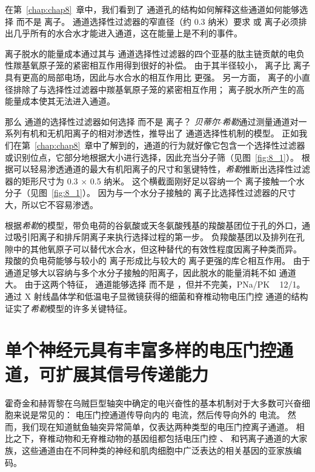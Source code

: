 在第~\ref{chap:chap8}~章中，我们看到了  通道孔的结构如何解释这些通道如何能够选择  而不是  离子。
 通道选择性过滤器的窄直径（约 0.3 纳米）要求  或  离子必须排出几乎所有的水合水才能进入通道，这在能量上是不利的事件。


 离子脱水的能量成本通过其与  通道选择性过滤器的四个亚基的肽主链贡献的电负性羰基氧原子笼的紧密相互作用得到很好的补偿。
由于其半径较小， 离子比  离子具有更高的局部电场，因此与水合水的相互作用比  更强。
另一方面， 离子的小直径排除了与选择性过滤器中羰基氧原子笼的紧密相互作用；
 离子脱水所产生的高能量成本使其无法进入通道。


那么  通道的选择性过滤器如何选择  而不是  离子？
\textit{贝蒂尔$\cdot$希勒}通过测量通道对一系列有机和无机阳离子的相对渗透性，推导出了  通道选择性机制的模型。
正如我们在第~\ref{chap:chap8}~章中了解到的，通道的行为就好像它包含一个选择性过滤器或识别位点，它部分地根据大小进行选择，因此充当分子筛（见图~\ref{fig:8_1}）。
根据可以轻易渗透通道的最大有机阳离子的尺寸和氢键特性，\textit{希勒}推断出选择性过滤器的矩形尺寸为 0.3 × 0.5 纳米。
这个横截面刚好足以容纳一个  离子接触一个水分子（见图~\ref{fig:8_1}）。
因为与一个水分子接触的  离子比选择性过滤器的尺寸大，所以它不容易渗透。


根据\textit{希勒}的模型，带负电荷的谷氨酸或天冬氨酸残基的羧酸基团位于孔的外口，通过吸引阳离子和排斥阴离子来执行选择过程的第一步。
负羧酸基团以及排列在孔隙中的其他氧原子可以替代水合水，但这种替代的有效性程度因离子种类而异。
羧酸的负电荷能够与较小的  离子形成比与较大的  离子更强的库仑相互作用。
由于  通道足够大以容纳与多个水分子接触的阳离子，因此脱水的能量消耗不如  通道大。
由于这两个特征， 通道能够选择  而不是 ，但并不完美，PNa/PK ~ 12/1。
通过 X 射线晶体学和低温电子显微镜获得的细菌和脊椎动物电压门控  通道的结构证实了\textit{希勒}模型的许多关键特征。



\section{单个神经元具有丰富多样的电压门控通道，可扩展其信号传递能力}

霍奇金和赫胥黎在乌贼巨型轴突中确定的电兴奋性的基本机制对于大多数可兴奋细胞来说是常见的：
电压门控通道传导向内的  电流，然后传导向外的  电流。
然而，我们现在知道鱿鱼轴突异常简单，仅表达两种类型的电压门控离子通道。
相比之下，脊椎动物和无脊椎动物的基因组都包括电压门控 、 和钙离子通道的大家族，这些通道由在不同种类的神经和肌肉细胞中广泛表达的相关基因的亚家族编码。



